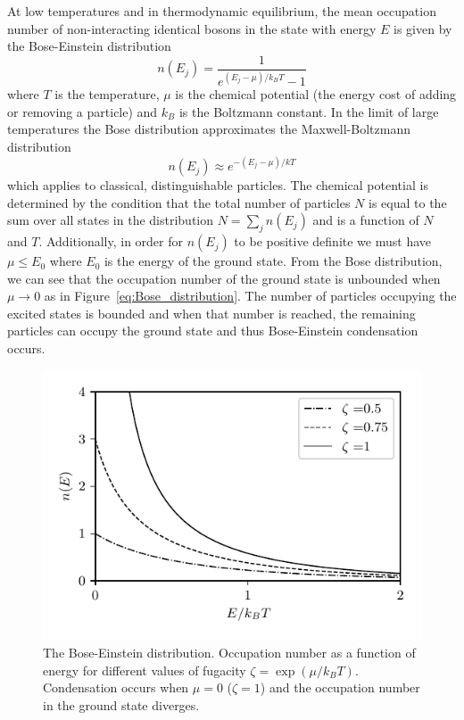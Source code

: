 At low temperatures and in thermodynamic equilibrium, the mean occupation number of non-interacting identical bosons in the state with energy $E$ is given by the Bose-Einstein distribution
%
\begin{equation}
	n(E_j)=\frac{1}{e^{(E_j-\mu)/k_BT}-1}
	\label{eq:Bose_distribution}	
\end{equation}
%
where $T$ is the temperature, $\mu$ is the chemical potential (the energy cost of adding or removing a particle) and $k_B$ is the Boltzmann constant. In the limit of large temperatures the Bose distribution approximates the Maxwell-Boltzmann distribution
%
\begin{equation}
	n(E_j)\approx e^{-(E_j-\mu)/kT}
\end{equation}
%
which applies to classical, distinguishable particles. The chemical potential is determined by the condition that the total number of particles $N$ is equal to the sum over all states in the distribution $N=\sum_jn(E_j)$ and is a function of $N$ and $T$. Additionally, in order for $n(E_j)$ to be positive definite we must have $\mu\leq E_0$ where $E_0$ is the energy of the ground state. From the Bose distribution, we can see that the occupation number of the ground state is unbounded when $\mu\rightarrow0$ as in Figure~\ref{eq:Bose_distribution}. The number of particles occupying the excited states is bounded and when that number is reached, the remaining particles can occupy the ground state and thus Bose-Einstein condensation occurs. 

\begin{figure}[htb]
\begin{center}
\includegraphics[]{Figures/Chapter2/Bose_distribution.pdf}
\caption[The Bose-Einstein distribution]{The Bose-Einstein distribution. Occupation number as a function of energy for different values of fugacity $\zeta=\exp(\mu /k_BT)$. Condensation occurs when $\mu=0$ ($\zeta=1$) and the occupation number in the ground state diverges.}
\label{fig:Bose_distribution}
\end{center}
\end{figure}

